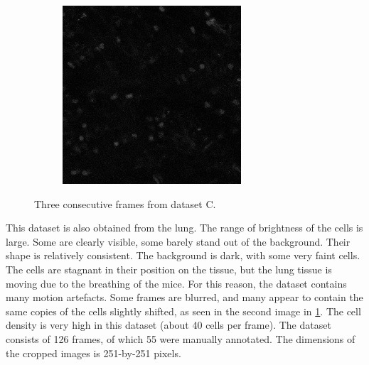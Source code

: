 \begin{figure}[h]
\begin{subfigure}{.32\textwidth}
    	\end{subfigure}
   		\hfill
  	    \begin{subfigure}{.32\textwidth}
   	  		\includegraphics[width=\textwidth]{images/series13greencropped010}
  	    \end{subfigure}
    	\caption{Three consecutive frames from dataset C.}
    	\label{fig:data_datasetC}
    \end{figure}
    
    This dataset is also obtained from the lung. The range of brightness of the cells is large. Some are clearly visible, some barely stand out of the background. Their shape is relatively consistent. The background is dark, with some very faint cells. The cells are stagnant in their position on the tissue, but the lung tissue is moving due to the breathing of the mice. For this reason, the dataset contains many motion artefacts. Some frames are blurred, and many appear to contain the same copies of the cells slightly shifted, as seen in the second image in \cref{fig:data_datasetC}. The cell density is very high in this dataset (about 40 cells per frame). The dataset consists of 126 frames, of which 55 were manually annotated. The dimensions of the cropped images is 251-by-251 pixels.

